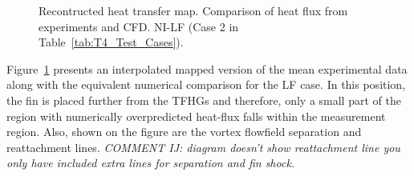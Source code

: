 \documentclass{AIAA}
\begin{document}
\begin{figure}[!h]
\center
\begin{adjustbox}{max width=1.1\columnwidth,center}
%
\end{adjustbox}
\caption{Recontructed heat transfer map. Comparison of heat flux from experiments and CFD. NI-LF (Case 2 in Table~\ref{tab:T4_Test_Cases}).}
\label{fig:HeatFluxNILF}
\end{figure} 



Figure~\ref{fig:HeatFluxNILF} presents an interpolated mapped version of the mean experimental data along with the equivalent numerical comparison for the LF case.
In this position, the fin is placed further from the TFHGs and therefore, only a small part of the region with numerically overpredicted heat-flux falls within the measurement region.
Also, shown on the figure are the vortex flowfield separation and reattachment lines.
{\it COMMENT IJ: diagram doesn't show reattachment line you only have included extra lines for separation and fin shock.}
\end{document}

